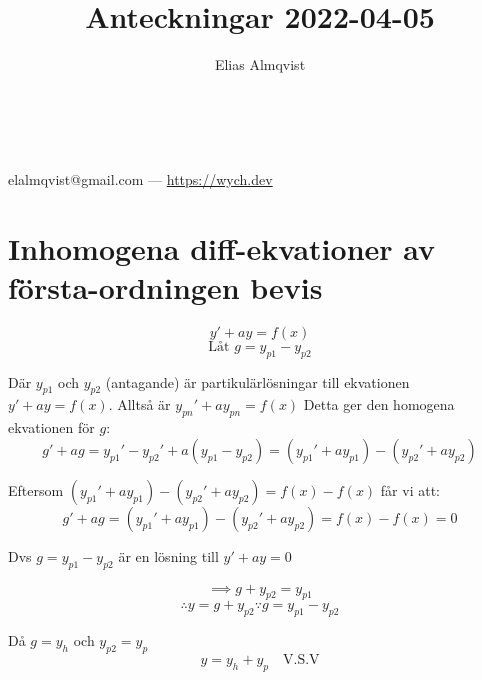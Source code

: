 \documentclass{article}
\makeatletter
\renewcommand{\maketitle}{
	\begin{center}
		{\huge\bfseries\thetitle}\\
		\vspace{1em}
		{\Large\theauthor} \\
		\vspace{1em}
		elalmqvist@gmail.com --- \url{https://wych.dev}
	\end{center}
}
\makeatother
\begin{document}
\title{Anteckningar 2022-04-05}
\author{Elias Almqvist}

\maketitle
\newpage

\section{Inhomogena diff-ekvationer av första-ordningen bevis}

$$
y' + ay = f(x)
$$
$$
\text{Låt } g = y_{p1} - y_{p2}
$$

Där $y_{p1}$ och $y_{p2}$ (antagande) är partikulärlösningar till ekvationen $y' + ay = f(x)$. Alltså är $y_{pn}' + ay_{pn} = f(x)$ Detta ger den homogena ekvationen för $g$:
$$
g' + ag = y_{p1}' - y_{p2}' + a\left(y_{p1} - y_{p2}\right) = \left( y_{p1}' + ay_{p1} \right) - \left( y_{p2}' + ay_{p2} \right)
$$

Eftersom $\left( y_{p1}' + ay_{p1} \right) - \left( y_{p2}' + ay_{p2} \right) = f(x) - f(x)$ får vi att: 
$$
g' + ag = \left( y_{p1}' + ay_{p1} \right) - \left( y_{p2}' + ay_{p2} \right) = f(x) - f(x) = 0
$$

Dvs $g = y_{p1} - y_{p2}$ är en lösning till $y' + ay = 0$

$$
\implies g + y_{p2} = y_{p1}
$$
$$
\therefore y = g + y_{p2} \because g = y_{p1} - y_{p2}
$$

Då $g = y_h$ och $y_{p2} = y_{p}$
$$
y = y_h + y_p \quad \text{V.S.V}
$$
\end{document}
